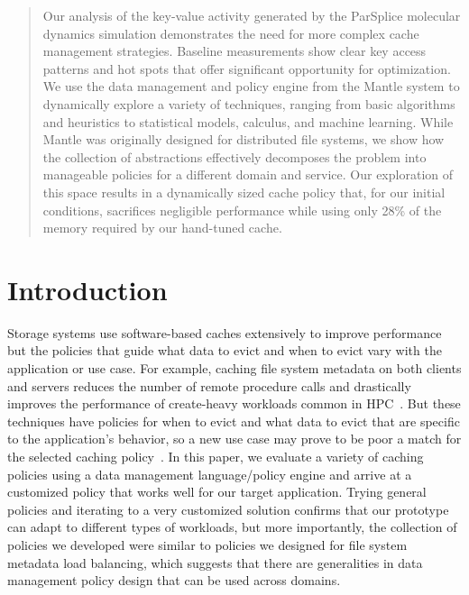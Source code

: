 \begin{abstract}

Our analysis of the key-value activity generated by the ParSplice molecular
dynamics simulation demonstrates the need for more complex cache management
strategies. Baseline measurements show clear key access patterns and hot
spots that offer significant opportunity for optimization. We use the data
management and policy engine from the Mantle system to dynamically explore a
variety of techniques, ranging from basic algorithms and heuristics to
statistical models, calculus, and machine learning. While Mantle was originally
designed for distributed file systems, we show how the collection of
abstractions effectively decomposes the problem into manageable policies for a
different domain and service.  Our exploration of this space results in a
dynamically sized cache policy that, for our initial conditions, sacrifices
negligible performance while using only 28\% of the memory required by our
hand-tuned cache.

\end{abstract}

\section{Introduction}

Storage systems use software-based caches extensively to improve performance
but the policies that guide what data to evict and when to evict vary with the
application or use case. For example, caching file system metadata on both
clients and servers reduces the number of remote procedure calls and
drastically improves the performance of create-heavy workloads common in
HPC~\cite{ren:sc2014-indexfs, patil:fast2011-giga+}. But these techniques have
policies for when to evict and what data to evict that are specific to the
application's behavior, so a new use case may prove to be poor a match for the
selected caching
policy~\cite{xiao:socc15-shardfs,brandt:msst2003-lh,sevilla:sc15-mantle,
weil:sc2004-dyn-metadata, weil:osdi2006-ceph}. In this paper, we evaluate a
variety of caching policies using a data management language/policy engine and
arrive at a customized policy that works well for our target application.
Trying general policies and iterating to a very customized solution confirms
that our prototype can adapt to different types of workloads, but more
importantly, the collection of policies we developed were similar to policies
we designed for file system metadata load balancing, which suggests that there
are generalities in data management policy design that can be used across
domains.

